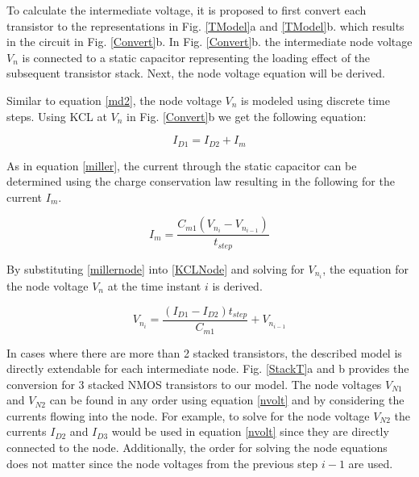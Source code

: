 To calculate the intermediate voltage, it is proposed to first convert each transistor to the representations in Fig. \ref{TModel}a and \ref{TModel}b. which results in the circuit in Fig. \ref{Convert}b. In Fig. \ref{Convert}b. the intermediate node voltage $V_n$ is connected to a static capacitor representing the loading effect of the subsequent transistor stack. Next, the node voltage equation will be derived.

Similar to equation \ref{md2}, the node voltage $V_n$ is modeled using discrete time steps. Using KCL at $V_n$ in Fig. \ref{Convert}b we get the following equation:

\begin{equation} \label{KCLNode}
I_{D1} = I_{D2} + I_m
\end{equation}

As in equation \ref{miller}, the current through the static capacitor can be determined using the charge conservation law resulting in the following for the current $I_m$.

\begin{equation} \label{millernode}
I_m = \frac{C_{m1}(V_{n_i} - V_{n_{i-1}})}{t_{step}}
\end{equation}

By substituting \ref{millernode} into \ref{KCLNode} and solving for $V_{n_i}$, the equation for the node voltage $V_n$ at the time instant $i$ is derived.

\begin{equation} \label{nvolt}
V_{n_i} = \frac{(I_{D1} - I_{D2})t_{step}}{C_{m1}} + V_{n_{i-1}}
\end{equation}

In cases where there are more than 2 stacked transistors, the described model is directly extendable for each intermediate node. Fig. \ref{StackT}a and b provides the conversion for 3 stacked NMOS transistors to our model. The node voltages $V_{N1}$ and $V_{N2}$ can be found in any order using equation \ref{nvolt} and by considering the currents flowing into the node. For example, to solve for the node voltage $V_{N2}$ the currents $I_{D2}$ and $I_{D3}$ would be used in equation \ref{nvolt} since they are directly connected to the node. Additionally, the order for solving the node equations does not matter since the node voltages from the previous step $i-1$ are used.

